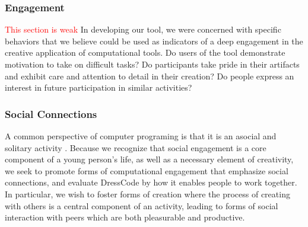 \documentclass{sigchi}
\begin{document}
\subsubsection{Engagement}
\textcolor{red}{This section is weak} %
In developing our tool, we were concerned with specific behaviors that we believe could be used as indicators of a deep engagement in the creative application of computational tools. Do users of the tool demonstrate motivation to take on difficult tasks? Do participants take pride in their artifacts and exhibit care and attention to detail in their creation? Do people express an interest in future participation in similar activities? 

\subsubsection{Social Connections}
A common perspective of computer programing is that it is an asocial and solitary activity \cite{introductory_programming}. Because we recognize that social engagement is a core component of a young person's life, as well as a necessary element of creativity, we seek to promote forms of computational engagement that emphasize social connections, and evaluate DressCode by how it enables people to work together. In particular, we wish to foster forms of creation where the process of creating with others is a central component of an activity, leading to forms of social interaction with peers which are both pleasurable and productive. 
\end{document}
